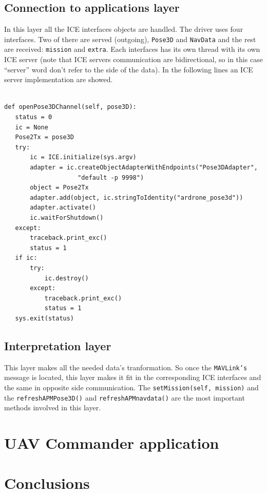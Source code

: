\documentclass{llncs}
\begin{document}
\subsection{Connection to applications layer}
\label{sec:apm_jderobot_comunication}

In this layer all the ICE interfaces objects are handled. The driver uses four interfaces. Two of there are served (outgoing), \texttt{Pose3D} and \texttt{NavData} and the rest are received: \texttt{mission} and \texttt{extra}.
Each interfaces has its own thread with its own ICE server (note that ICE servers communication are bidirectional, so in this case ``server'' word don't refer to the side of the data).
In the following lines an ICE server implementation are showed.
{\scriptsize
\begin{lstlisting}

def openPose3DChannel(self, pose3D):
   status = 0
   ic = None
   Pose2Tx = pose3D
   try:
       ic = ICE.initialize(sys.argv)
       adapter = ic.createObjectAdapterWithEndpoints("Pose3DAdapter", 
       				"default -p 9998")
       object = Pose2Tx
       adapter.add(object, ic.stringToIdentity("ardrone_pose3d")) 
       adapter.activate()
       ic.waitForShutdown()
   except:
       traceback.print_exc()
       status = 1
   if ic:
       try:
           ic.destroy()
       except:
           traceback.print_exc()
           status = 1
   sys.exit(status)
\end{lstlisting}}

\subsection{Interpretation layer}
\label{interpretation_layer}

This layer makes all the needed data's tranformation. So once the \texttt{MAVLink's} message is located, this layer makes it fit in the corresponding ICE interfaces and the same in opposite side communication. 
The \texttt{setMission(self, mission)} and the \texttt{refreshAPMPose3D()} and
\texttt{refreshAPMnavdata()} are the most important methods involved in this layer.

\section{UAV Commander application}

\section{Conclusions}
\end{document}
